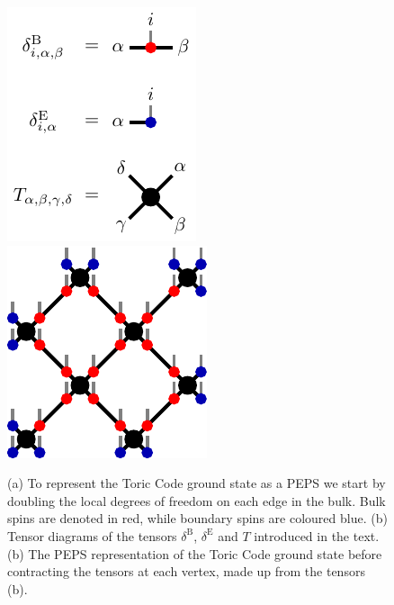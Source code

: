 \begin{figure}
	\centering
	\subcaptionbox{\label{fig:toric_code_doubling_dof}}
	{%
		\usebox{\largestimage}
	}
	\quad
	\subcaptionbox{\label{fig:toric_code_PEPS_representation_tensor_definitions}}
	{%
		\raisebox{\dimexpr.5\ht\largestimage-.5\height}
		{%
			\includegraphics[scale=1]{figures/tikz/toric_code/peps_representation/peps_representation_b.pdf}
		}
	}
	\quad
	\subcaptionbox{\label{fig:toric_code_PEPS_representation}}
	{%
		\raisebox{\dimexpr.5\ht\largestimage-.5\height}
		{%
			\includegraphics[scale=1]{figures/tikz/toric_code/peps_representation/peps_representation_c.pdf}
		}
	}
	\caption{(a) To represent the Toric Code ground state as a PEPS we start by doubling the local degrees of freedom on each edge in the bulk. Bulk spins are denoted in red, while boundary spins are coloured blue. (b) Tensor diagrams of the tensors $\delta^\text{B}$, $\delta^\text{E}$ and $T$ introduced in the text. (b) The PEPS representation of the Toric Code ground state before contracting the tensors at each vertex, made up from the tensors (b).}
	\label{fig:toric_code_doubling_dof_and_PEPS_representation}
\end{figure}
